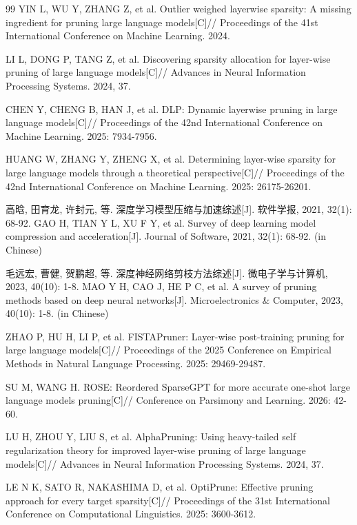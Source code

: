 \begin{thebibliography}{99}
YIN L, WU Y, ZHANG Z, et al.
Outlier weighed layerwise sparsity: A missing ingredient for pruning large language models[C]//
Proceedings of the 41st International Conference on Machine Learning.
2024.

LI L, DONG P, TANG Z, et al.
Discovering sparsity allocation for layer-wise pruning of large language models[C]//
Advances in Neural Information Processing Systems.
2024, 37.

CHEN Y, CHENG B, HAN J, et al.
DLP: Dynamic layerwise pruning in large language models[C]//
Proceedings of the 42nd International Conference on Machine Learning.
2025: 7934-7956.

HUANG W, ZHANG Y, ZHENG X, et al.
Determining layer-wise sparsity for large language models through a theoretical perspective[C]//
Proceedings of the 42nd International Conference on Machine Learning.
2025: 26175-26201.

高晗, 田育龙, 许封元, 等.
深度学习模型压缩与加速综述[J].
软件学报, 2021, 32(1): 68-92.
GAO H, TIAN Y L, XU F Y, et al. Survey of deep learning model compression and acceleration[J].
Journal of Software, 2021, 32(1): 68-92. (in Chinese)

毛远宏, 曹健, 贺鹏超, 等.
深度神经网络剪枝方法综述[J].
微电子学与计算机, 2023, 40(10): 1-8.
MAO Y H, CAO J, HE P C, et al. A survey of pruning methods based on deep neural networks[J].
Microelectronics \& Computer, 2023, 40(10): 1-8. (in Chinese)

ZHAO P, HU H, LI P, et al.
FISTAPruner: Layer-wise post-training pruning for large language models[C]//
Proceedings of the 2025 Conference on Empirical Methods in Natural Language Processing.
2025: 29469-29487.

SU M, WANG H.
ROSE: Reordered SparseGPT for more accurate one-shot large language models pruning[C]//
Conference on Parsimony and Learning.
2026: 42-60.

LU H, ZHOU Y, LIU S, et al.
AlphaPruning: Using heavy-tailed self regularization theory for improved layer-wise pruning of large language models[C]//
Advances in Neural Information Processing Systems.
2024, 37.

LE N K, SATO R, NAKASHIMA D, et al.
OptiPrune: Effective pruning approach for every target sparsity[C]//
Proceedings of the 31st International Conference on Computational Linguistics.
2025: 3600-3612.


\end{thebibliography}
